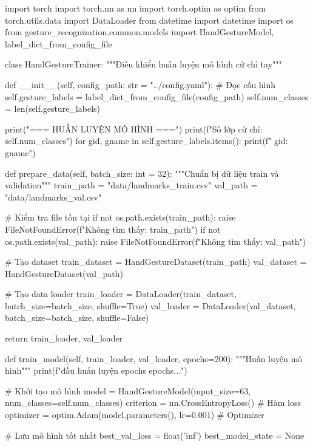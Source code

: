 \begin{aivncodebox}
\begin{python}
import torch
import torch.nn as nn
import torch.optim as optim
from torch.utils.data import DataLoader
from datetime import datetime
import os
from gesture_recognization.common.models import HandGestureModel, label_dict_from_config_file

class HandGestureTrainer:
    """Điều khiển huấn luyện mô hình cử chỉ tay"""
    
    def __init__(self, config_path: str = "../config.yaml"):
        # Đọc cấu hình
        self.gesture_labels = label_dict_from_config_file(config_path)
        self.num_classes = len(self.gesture_labels)
        
        print("=== HUẤN LUYỆN MÔ HÌNH ===")
        print(f"Số lớp cử chỉ: {self.num_classes}")
        for gid, gname in self.gesture_labels.items():
            print(f"  {gid}: {gname}")
    
    def prepare_data(self, batch_size: int = 32):
        """Chuẩn bị dữ liệu train và validation"""
        train_path = "data/landmarks_train.csv"
        val_path = "data/landmarks_val.csv"
        
        # Kiểm tra file tồn tại
        if not os.path.exists(train_path):
            raise FileNotFoundError(f"Không tìm thấy: {train_path}")
        if not os.path.exists(val_path):
            raise FileNotFoundError(f"Không tìm thấy: {val_path}")
        
        # Tạo dataset
        train_dataset = HandGestureDataset(train_path)
        val_dataset = HandGestureDataset(val_path)
        
        # Tạo data loader
        train_loader = DataLoader(train_dataset, batch_size=batch_size, shuffle=True)
        val_loader = DataLoader(val_dataset, batch_size=batch_size, shuffle=False)
        
        return train_loader, val_loader
    
    def train_model(self, train_loader, val_loader, epochs=200):
        """Huấn luyện mô hình"""
        print(f" đầu huấn luyện {epochs} epochs...")
        
        # Khởi tạo mô hình
        model = HandGestureModel(input_size=63, num_classes=self.num_classes)
        criterion = nn.CrossEntropyLoss()  # Hàm loss
        optimizer = optim.Adam(model.parameters(), lr=0.001)  # Optimizer
        
        # Lưu mô hình tốt nhất
        best_val_loss = float('inf')
        best_model_state = None
        

\end{python}
\end{aivncodebox}
